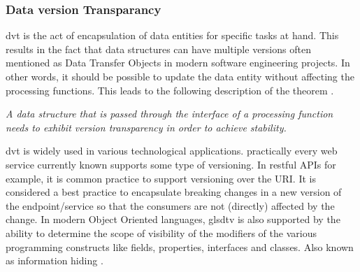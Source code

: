 \subsubsection*{Data version Transparancy}

\gls{dvt} is the act of encapsulation of data entities for specific tasks at hand. This
results in the fact that data structures can have multiple versions often mentioned as
Data Transfer Objects in modern software engineering projects. In other words, it should
be possible to update the data entity without affecting the processing functions. This
leads to the following description of the theorem \parencite[280]{mannaert_normalized_2016}.

\begin{tcolorbox}[boxrule=0.1pt, colback=mygray, title=Theorem II,colbacktitle=gray]
    \textit{A data structure that is passed through the interface of a processing function
    needs to exhibit version transparency in order to achieve stability.}
\end{tcolorbox}

\gls{dvt} is widely used in various technological applications. practically every web
service currently known supports some type of versioning. In restful APIs for example, it
is common practice to support versioning over the URI. It is considered a best practice
to encapsulate breaking changes in a new version of the endpoint/service so that the
consumers are not (directly) affected by the change. In modern Object Oriented languages,
gls{dtv} is also supported by the ability to determine the scope of visibility of the
modifiers of the various programming constructs like fields, properties, interfaces and
classes. Also known as information hiding
\parencites{parnas_criteria_1972}[278]{mannaert_normalized_2016}.